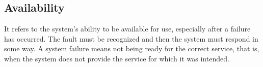 \subsection{Availability}

It refers to the system's ability to be available for use, especially after a failure has occurred. The fault must be recognized and then the system must respond in some way. A system failure means not being ready for the correct service, that is, when the system does not provide the service for which it was intended.